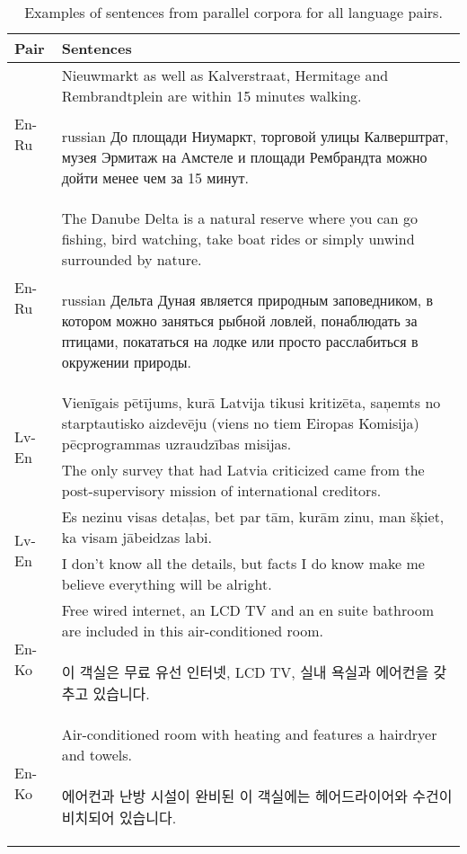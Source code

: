 \documentclass[]{article}
\begin{document}
\begin{table}
\begin{center}
\begin{tabular}{ l p{10cm} }
Pair & Sentences \\
\hline
\multirow{2}{4em}{En-Ru}
& Nieuwmarkt as well as Kalverstraat, Hermitage and Rembrandtplein are within 15 minutes walking. \\
& \begin{otherlanguage*}{russian}
До площади Ниумаркт, торговой улицы Калверштрат, музея Эрмитаж на Амстеле и площади Рембрандта можно дойти менее чем за 15 минут.
\end{otherlanguage*} \\
\hline
\multirow{2}{4em}{En-Ru}
& The Danube Delta is a natural reserve where you can go fishing, bird watching, take boat rides or simply unwind surrounded by nature. \\
& \begin{otherlanguage*}{russian}
Дельта Дуная является природным заповедником, в котором можно заняться рыбной ловлей, понаблюдать за птицами, покататься на лодке или просто расслабиться в окружении природы. \end{otherlanguage*} \\
\hline
\multirow{2}{4em}{Lv-En}
& Vienīgais pētījums, kurā Latvija tikusi kritizēta, saņemts no starptautisko aizdevēju (viens no tiem Eiropas Komisija) pēcprogrammas uzraudzības misijas. \\
& The only survey that had Latvia criticized came from the post-supervisory mission of international creditors. \\
\hline
\multirow{2}{4em}{Lv-En}
& Es nezinu visas detaļas, bet par tām, kurām zinu, man šķiet, ka visam jābeidzas labi. \\
& I don’t know all the details, but facts I do know make me believe everything will be alright. \\
\hline
\multirow{2}{4em}{En-Ko}
& Free wired internet, an LCD TV and an en suite bathroom are included in this air-conditioned room. \\
& \begin{CJK}{UTF8}{mj}
  이 객실은 무료 유선 인터넷, LCD TV, 실내 욕실과 에어컨을 갖추고 있습니다.
  \end{CJK} \\
\hline
\multirow{2}{4em}{En-Ko}
& Air-conditioned room with heating and features a hairdryer and towels. \\
& \begin{CJK}{UTF8}{mj}
  에어컨과 난방 시설이 완비된 이 객실에는 헤어드라이어와 수건이 비치되어 있습니다.
  \end{CJK}
\end{tabular}
\end{center}
\caption{Examples of sentences from parallel corpora for all language pairs.}
\label{table:corpora_examples}
\end{table}
\end{document}
